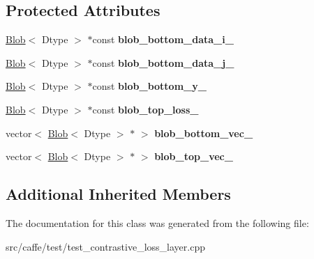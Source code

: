 \subsection*{Protected Attributes}
\begin{DoxyCompactItemize}
\item 
\mbox{\label{classcaffe_1_1_contrastive_loss_layer_test_a3db073eba345adf8d1602398465ce6fc}} 
\mbox{\hyperlink{classcaffe_1_1_blob}{Blob}}$<$ Dtype $>$ $\ast$const {\bfseries blob\+\_\+bottom\+\_\+data\+\_\+i\+\_\+}
\item 
\mbox{\label{classcaffe_1_1_contrastive_loss_layer_test_aa6262fb20eb18c21eba973ac8137cbb7}} 
\mbox{\hyperlink{classcaffe_1_1_blob}{Blob}}$<$ Dtype $>$ $\ast$const {\bfseries blob\+\_\+bottom\+\_\+data\+\_\+j\+\_\+}
\item 
\mbox{\label{classcaffe_1_1_contrastive_loss_layer_test_aa14f26239554ddc147bb94195b4da4b6}} 
\mbox{\hyperlink{classcaffe_1_1_blob}{Blob}}$<$ Dtype $>$ $\ast$const {\bfseries blob\+\_\+bottom\+\_\+y\+\_\+}
\item 
\mbox{\label{classcaffe_1_1_contrastive_loss_layer_test_a0ff755eed0b2cf13281de5b201a13434}} 
\mbox{\hyperlink{classcaffe_1_1_blob}{Blob}}$<$ Dtype $>$ $\ast$const {\bfseries blob\+\_\+top\+\_\+loss\+\_\+}
\item 
\mbox{\label{classcaffe_1_1_contrastive_loss_layer_test_ae670b2f1554ded927619675ce33059ca}} 
vector$<$ \mbox{\hyperlink{classcaffe_1_1_blob}{Blob}}$<$ Dtype $>$ $\ast$ $>$ {\bfseries blob\+\_\+bottom\+\_\+vec\+\_\+}
\item 
\mbox{\label{classcaffe_1_1_contrastive_loss_layer_test_a071fe0752adf58795c31978439c7187d}} 
vector$<$ \mbox{\hyperlink{classcaffe_1_1_blob}{Blob}}$<$ Dtype $>$ $\ast$ $>$ {\bfseries blob\+\_\+top\+\_\+vec\+\_\+}
\end{DoxyCompactItemize}
\subsection*{Additional Inherited Members}


The documentation for this class was generated from the following file\+:\begin{DoxyCompactItemize}
\item 
src/caffe/test/test\+\_\+contrastive\+\_\+loss\+\_\+layer.\+cpp\end{DoxyCompactItemize}
